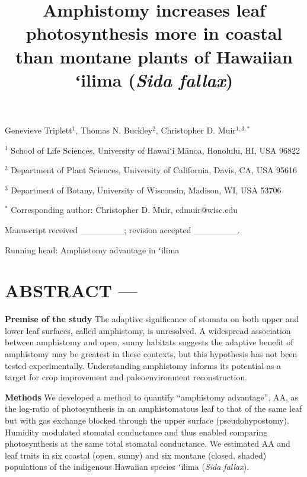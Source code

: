 \documentclass[
  letterpaper,
  DIV=11,
  numbers=noendperiod]{scrartcl}
\title{Amphistomy increases leaf photosynthesis more in coastal than
montane plants of Hawaiian ʻilima (\emph{Sida fallax})}
\author{}
\date{}
\begin{document}
\maketitle
\ifdefined\Shaded\renewenvironment{Shaded}{\begin{tcolorbox}[frame hidden, interior hidden, sharp corners, breakable, borderline west={3pt}{0pt}{shadecolor}, boxrule=0pt, enhanced]}{\end{tcolorbox}}\fi

\begin{center}
Genevieve Triplett$^1$, Thomas N. Buckley$^2$, Christopher D. Muir$^{1,3,*}$
\end{center}

\(^1\) School of Life Sciences, University of Hawaiʻi Mānoa, Honolulu,
HI, USA 96822

\(^2\) Department of Plant Sciences, University of California, Davis,
CA, USA 95616

\(^3\) Department of Botany, University of Wisconsin, Madison, WI, USA
53706

\(^*\) Corresponding author: Christopher D. Muir, cdmuir@wisc.edu

Manuscript received \_\_\_\_\_\_\_; revision accepted \_\_\_\_\_\_\_.

Running head: Amphistomy advantage in ʻilima

\newpage

\hypertarget{abstract}{%
\section{ABSTRACT ---}\label{abstract}}

\noindent \textbf{Premise of the study} The adaptive significance of
stomata on both upper and lower leaf surfaces, called amphistomy, is
unresolved. A widespread association between amphistomy and open, sunny
habitats suggests the adaptive benefit of amphistomy may be greatest in
these contexts, but this hypothesis has not been tested experimentally.
Understanding amphistomy informs its potential as a target for crop
improvement and paleoenvironment reconstruction.

\textbf{Methods} We developed a method to quantify ``amphistomy
advantage'', \(\mathrm{AA}\), as the log-ratio of photosynthesis in an
amphistomatous leaf to that of the same leaf but with gas exchange
blocked through the upper surface (pseudohypostomy). Humidity modulated
stomatal conductance and thus enabled comparing photosynthesis at the
same total stomatal conductance. We estimated \(\mathrm{AA}\) and leaf
traits in six coastal (open, sunny) and six montane (closed, shaded)
populations of the indigenous Hawaiian species ʻilima (\emph{Sida
fallax}).
\end{document}
